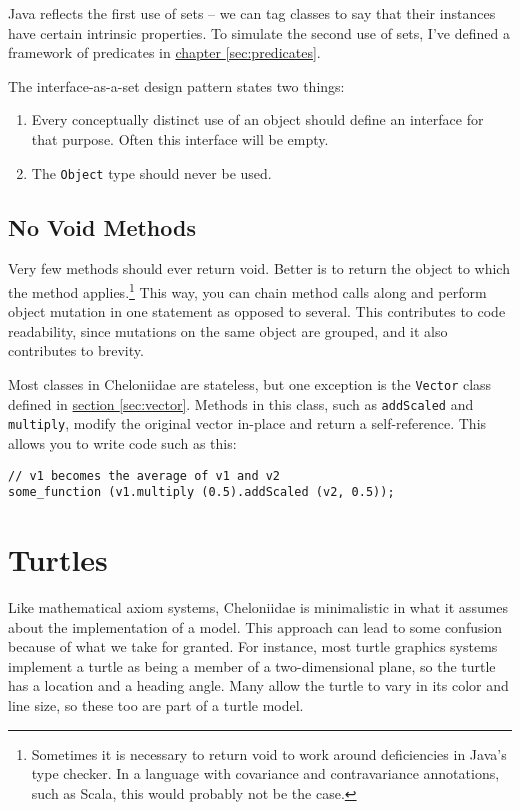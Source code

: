 \documentclass{report}
\newcommand{\Ref}[2]{\hyperref[#2]{#1 \ref*{#2}}}
\begin{document}
      Java reflects the first use of sets -- we can tag classes to say that their instances have certain intrinsic properties. To simulate the second use of
      sets, I've defined a framework of predicates in \Ref{chapter}{sec:predicates}.

      The interface-as-a-set design pattern states two things:

\begin{enumerate}
\item Every conceptually distinct use of an object should define an interface for that purpose. Often this interface will be empty.
\item The {\tt Object} type should never be used.
\end{enumerate}

\section {No Void Methods} \label{sec:no-void-methods}
      Very few methods should ever return void. Better is to return the object to which the method applies.\footnote{Sometimes it is necessary to return void to
        work around deficiencies in Java's type checker. In a language with covariance and contravariance annotations, such as Scala, this would probably not be
        the case.} This way, you can chain method calls along and perform object mutation in one statement as opposed to several. This contributes to code
      readability, since mutations on the same object are grouped, and it also contributes to brevity.

      Most classes in Cheloniidae are stateless, but one exception is the {\tt Vector} class defined in \Ref{section}{sec:vector}. Methods in this class, such as
      {\tt addScaled} and {\tt multiply}, modify the original vector in-place and return a self-reference. This allows you to write code such as this:

\begin{verbatim}
// v1 becomes the average of v1 and v2
some_function (v1.multiply (0.5).addScaled (v2, 0.5));
\end{verbatim}

\chapter {Turtles} \label{sec:turtles}
    Like mathematical axiom systems, Cheloniidae is minimalistic in what it assumes about the implementation of a model. This approach can lead to some
    confusion because of what we take for granted. For instance, most turtle graphics systems implement a turtle as being a member of a two-dimensional plane,
    so the turtle has a location and a heading angle. Many allow the turtle to vary in its color and line size, so these too are part of a turtle model.
\end{document}

